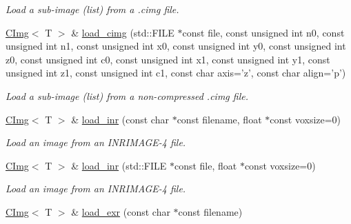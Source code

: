 \begin{DoxyCompactItemize}
\begin{DoxyCompactList}\small\item\em Load a sub-\/image (list) from a .cimg file. \item\end{DoxyCompactList}\item 
\hypertarget{structcimg__library_1_1CImg_a655f65649d9d148618c267a83c230e77}{
\hyperlink{structcimg__library_1_1CImg}{CImg}$<$ T $>$ \& \hyperlink{structcimg__library_1_1CImg_a655f65649d9d148618c267a83c230e77}{load\_\-cimg} (std::FILE $\ast$const file, const unsigned int n0, const unsigned int n1, const unsigned int x0, const unsigned int y0, const unsigned int z0, const unsigned int c0, const unsigned int x1, const unsigned int y1, const unsigned int z1, const unsigned int c1, const char axis='z', const char align='p')}
\label{structcimg__library_1_1CImg_a655f65649d9d148618c267a83c230e77}

\begin{DoxyCompactList}\small\item\em Load a sub-\/image (list) from a non-\/compressed .cimg file. \item\end{DoxyCompactList}\item 
\hypertarget{structcimg__library_1_1CImg_a4a1bebfe52d369d35ad6f9d63b46fc64}{
\hyperlink{structcimg__library_1_1CImg}{CImg}$<$ T $>$ \& \hyperlink{structcimg__library_1_1CImg_a4a1bebfe52d369d35ad6f9d63b46fc64}{load\_\-inr} (const char $\ast$const filename, float $\ast$const voxsize=0)}
\label{structcimg__library_1_1CImg_a4a1bebfe52d369d35ad6f9d63b46fc64}

\begin{DoxyCompactList}\small\item\em Load an image from an INRIMAGE-\/4 file. \item\end{DoxyCompactList}\item 
\hypertarget{structcimg__library_1_1CImg_a5179136bacecd9675022a34c0b94bc5c}{
\hyperlink{structcimg__library_1_1CImg}{CImg}$<$ T $>$ \& \hyperlink{structcimg__library_1_1CImg_a5179136bacecd9675022a34c0b94bc5c}{load\_\-inr} (std::FILE $\ast$const file, float $\ast$const voxsize=0)}
\label{structcimg__library_1_1CImg_a5179136bacecd9675022a34c0b94bc5c}

\begin{DoxyCompactList}\small\item\em Load an image from an INRIMAGE-\/4 file. \item\end{DoxyCompactList}\item 
\hypertarget{structcimg__library_1_1CImg_ad76fcbdb1af17afa897733aaa9db5ab5}{
\hyperlink{structcimg__library_1_1CImg}{CImg}$<$ T $>$ \& \hyperlink{structcimg__library_1_1CImg_ad76fcbdb1af17afa897733aaa9db5ab5}{load\_\-exr} (const char $\ast$const filename)}
\label{structcimg__library_1_1CImg_ad76fcbdb1af17afa897733aaa9db5ab5}


\end{DoxyCompactItemize}
